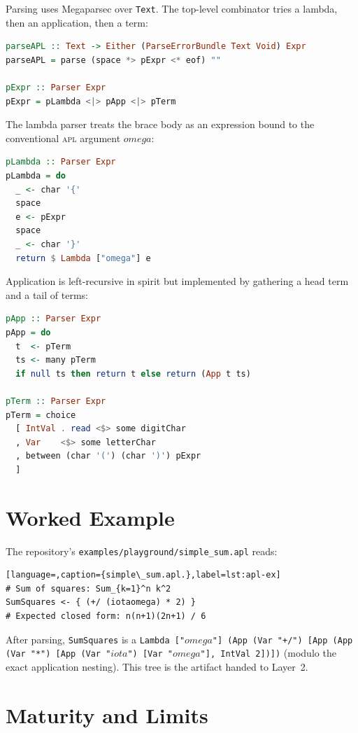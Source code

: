 Parsing uses Megaparsec over \texttt{Text}. The top-level combinator tries a
lambda, then an application, then a term:
\begin{lstlisting}[language=Haskell,caption={Top-level parser (Parser.hs).},label=lst:apl-parse]
parseAPL :: Text -> Either (ParseErrorBundle Text Void) Expr
parseAPL = parse (space *> pExpr <* eof) ""

pExpr :: Parser Expr
pExpr = pLambda <|> pApp <|> pTerm
\end{lstlisting}
The lambda parser treats the brace body as an expression bound to the
conventional \textsc{apl} argument \texttt{\ensuremath{omega}}:
\begin{lstlisting}[language=Haskell,caption={Lambda parsing (Parser.hs).},label=lst:apl-lambda]
pLambda :: Parser Expr
pLambda = do
  _ <- char '{'
  space
  e <- pExpr
  space
  _ <- char '}'
  return $ Lambda ["omega"] e
\end{lstlisting}
Application is left-recursive in spirit but implemented by gathering a head
term and a tail of terms:
\begin{lstlisting}[language=Haskell,caption={Application and term parsing (Parser.hs).},label=lst:apl-app]
pApp :: Parser Expr
pApp = do
  t  <- pTerm
  ts <- many pTerm
  if null ts then return t else return (App t ts)

pTerm :: Parser Expr
pTerm = choice
  [ IntVal . read <$> some digitChar
  , Var    <$> some letterChar
  , between (char '(') (char ')') pExpr
  ]
\end{lstlisting}

\section{Worked Example}
\label{sec:apl-example}

The repository's \texttt{examples/playground/simple\_sum.apl} reads:
\begin{lstlisting}[language=,caption={simple\_sum.apl.},label=lst:apl-ex]
# Sum of squares: Sum_{k=1}^n k^2
SumSquares <- { (+/ (iotaomega) * 2) }
# Expected closed form: n(n+1)(2n+1) / 6
\end{lstlisting}
After parsing, \texttt{SumSquares} is a \texttt{Lambda ["\ensuremath{omega}"] (App (Var "+/")
[App (App (Var "*") [App (Var "\ensuremath{iota}") [Var "\ensuremath{omega}"], IntVal 2])])} (modulo the exact
application nesting). This tree is the artifact handed to Layer~2.

\section{Maturity and Limits}
\label{sec:apl-limits}

